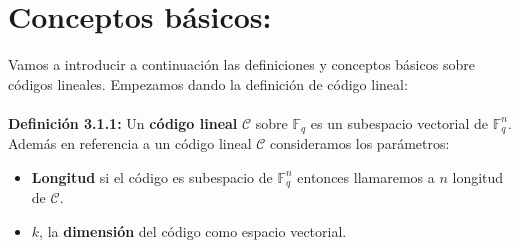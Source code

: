 \documentclass[11pt,spanish]{book}
\begin{document}
\section{Conceptos básicos:}
Vamos a introducir a continuación las definiciones y conceptos básicos sobre códigos lineales. Empezamos dando la definición de código lineal:\\
\\ \textbf{Definición 3.1.1:} Un \textbf{código lineal} $\mathcal{C}$ sobre $\mathbb{F}_{q}$ es un subespacio vectorial de $\mathbb{F}_{q}^{n}$.\\
Además en referencia a un código lineal $\mathcal{C}$ consideramos los parámetros:
\begin{itemize}
    \item \textbf{Longitud} si el código es subespacio de $\mathbb{F}_{q}^{n}$ entonces llamaremos a $n$ longitud de $\mathcal{C}$. 
    \item $k$, la \textbf{dimensión} del código como espacio vectorial.
\end{itemize}
\end{document}
